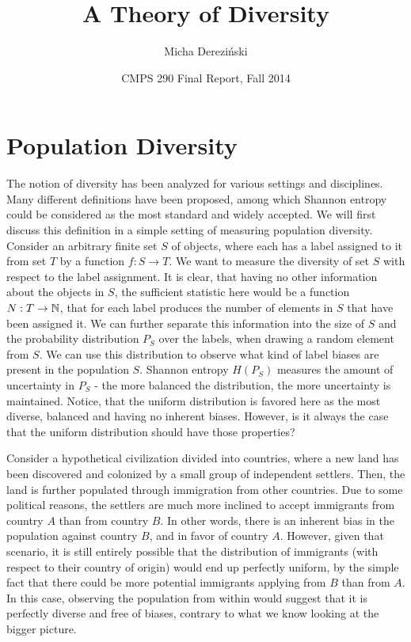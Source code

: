 \documentclass{article} %
\title{A Theory of Diversity}
\author{Micha{\polishl} Derezi\'{n}ski}
\date{CMPS 290 Final Report, Fall 2014}
\begin{document}
\maketitle

\section{Population Diversity}
\label{sec:population-diversity}
The notion of diversity has been analyzed for various settings and
disciplines. Many different definitions have been proposed, among
which Shannon entropy could be considered as the most standard and widely
accepted. We will first discuss this definition in a simple setting of
measuring population diversity. Consider an arbitrary finite set $S$ of
objects, where each has a label assigned to it from set $T$ by a function
$f:S\rightarrow T$. We want to measure the diversity of set $S$ with
respect to the label assignment. It is clear, that having no other
information about the objects in $S$, the sufficient statistic here
would be a function $N:T\rightarrow {\mathbb N}$, that for each label produces
the number of elements in $S$ that have been assigned it. We can
further separate this information into the size of $S$ and the
probability distribution $P_S$ over the labels, when drawing a random
element from $S$. We can use this distribution to observe what kind of
label biases are present in the population $S$. Shannon entropy
$H(P_S)$ measures the amount of uncertainty in $P_S$ - the more
balanced the distribution, the more uncertainty 
is maintained. Notice, that the uniform distribution is favored here as
the most diverse, balanced and having no inherent biases. However, is
it always the case that the uniform distribution should have those
properties? 

Consider a hypothetical civilization divided into countries, where a
new land has been discovered and colonized by a small group of
independent settlers. Then, the land is further populated through
immigration from other countries. Due to some political reasons, the
settlers are much more inclined to accept immigrants from country $A$
than from country $B$. In other words, there is an inherent bias in
the population against country $B$, and in favor of country
$A$. However, given that scenario, it is still entirely possible that
the distribution of immigrants (with respect to their country of
origin) would end up perfectly uniform, by the simple fact that there
could be more potential immigrants applying from $B$ than from $A$. In
this case, observing the population from within would suggest that it
is perfectly diverse and free of biases, contrary to what we know
looking at the bigger picture. 
\end{document}
